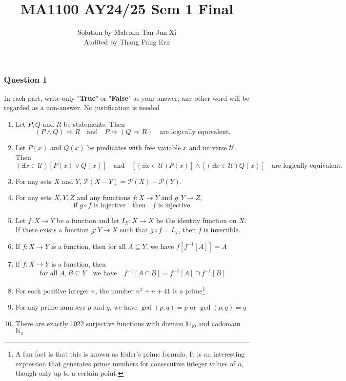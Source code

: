\documentclass[12pt]{article}
\title{MA1100 AY24/25 Sem 1 Final}
\author{
  Solution by Malcolm Tan Jun Xi\\
  Audited by Thang Pang Ern
}
\date{}
\begin{document}
\maketitle
\subsubsection*{Question 1}
In each part, write only "\textbf{True}" or "\textbf{False}" as your answer; any other word will be regarded as a non-answer. No justification is needed
\begin{enumerate}[label=\textbf{(\alph*)}]
\itemsep 0em
    \item Let $P,Q$ and $R$ be statements. Then \[\left(P\land Q\right)\Rightarrow R\quad\text{and}\quad P\Rightarrow\left(Q\Rightarrow R\right)\quad\text{are logically equivalent}.\] 
    \item Let $P(x)$ and $Q(x)$ be predicates with free variable $x$ and universe $\mathcal{U}$. Then \[(\exists x\in\mathcal{U})[P(x)\lor Q(x)]\quad\text{and}\quad [(\exists x\in\mathcal{U})P(x)]\land[(\exists x\in\mathcal{U})Q(x)]\quad\text{are logically equivalent}.\] 
    \item For any sets $X$ and $Y$, $\mathcal{P}(X-Y)=\mathcal{P}(X)-\mathcal{P}(Y)$.
    \item For any sets $X,Y,Z$ and any functions $f:X\to Y$ and $g:Y\to Z$, \[\text{if }g\circ f\text{ is injective}\quad\text{then}\quad f\text{ is injective}.\]
    \item Let $f:X\to Y$ be a function and let $I_X:X\to X$ be the identity function on $X$. If there exists a function $g:Y\to X$ such that $g\circ f=I_X$, then $f$ is invertible.
    \item If $f:X\to Y$ is a function, then for all $A\subseteq Y$, we have $f[f^{-1}[A]]=A$
    \item If $f: X\to Y$ is a function, then \[\text{for all }A,B\subseteq Y\quad\text{we have}\quad f^{-1}\left[A\cap B\right]=f^{-1}\left[A\right]\cap f^{-1}\left[B\right]\]
    \item For each positive integer $n$, the number $n^2+n+41$ is a prime\footnote{A fun fact is that this is known as Euler's prime formula. It is an interesting expression that generates prime numbers for consecutive integer values of $n$, though only up to a certain point.}
    \item For any prime numbers $p$ and $q$, we have $\gcd(p,q)=p$ or $\gcd(p,q)=q$
    \item There are exactly 1022 surjective functions with domain $\mathbb{N}_{10}$ and codomain $\mathbb{N}_{2}$
\end{enumerate}
\end{document}
